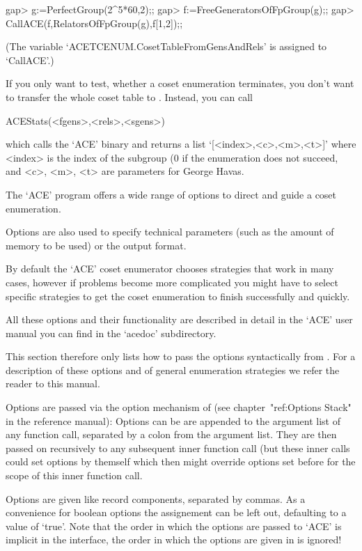 \begintt
gap> g:=PerfectGroup(2^5*60,2);;
gap> f:=FreeGeneratorsOfFpGroup(g);;
gap> CallACE(f,RelatorsOfFpGroup(g),f{[1,2]});;
\endtt

(The variable `ACETCENUM.CosetTableFromGensAndRels' is assigned to
`CallACE'.)

If you only want to test, whether a coset enumeration terminates, you don't
want to transfer the whole coset table to {\GAP}. Instead, you can call

\>ACEStats(<fgens>,<rels>,<sgens>)

which calls the `ACE' binary and returns a list `[<index>,<c>,<m>,<t>]'
where <index> is the index of the subgroup (0 if the enumeration does not
succeed, and <c>, <m>, <t> are parameters for George Havas.


The `ACE' program offers a wide range of options to direct and guide a
coset enumeration.

Options are also used to specify technical parameters (such as the amount of
memory to be used) or the output format.

By default the `ACE' coset enumerator chooses strategies that work in many 
cases, however if problems become more complicated you might have to select
specific strategies to get the coset enumeration to finish successfully and
quickly.

All these options and their functionality are described in detail in the
`ACE' user manual you can find in the `acedoc' subdirectory.

This section therefore only lists how to pass the options syntactically from
{\GAP}. For a description of these options and of general enumeration
strategies we refer the reader to this manual.

Options are passed via the option mechanism of {\GAP} (see
chapter~"ref:Options Stack" in the reference manual):
Options can be are appended to the argument list of any function call,
separated by a colon from the argument list. They are then passed on
recursively to any subsequent inner function call (but these inner calls
could set options by themself which then might override options set before
for the scope of this inner function call.

Options are given like record components, separated by commas. As a
convenience for boolean options the assignement can be left out, defaulting
to a value of `true'. Note that the order in which the options are passed to
`ACE' is implicit in the interface, the order in which the options are given
in {\GAP} is ignored!

